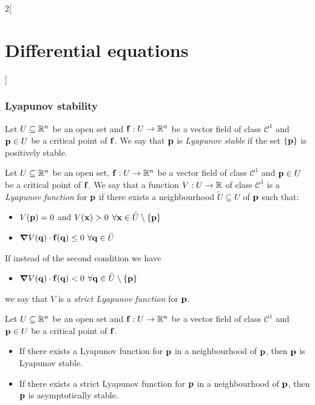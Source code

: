 \documentclass[../../../main.tex]{subfiles}
\begin{document}
\begin{multicols}{2}[\section{Differential equations}]
  \subsubsection{Lyapunov stability}
  \begin{definition}
    Let $U\subseteq \mathbb{R}^n$ be an open set and $\boldsymbol{\mathrm{f}}:U\rightarrow\mathbb{R}^n$ be a vector field of class $\mathcal{C}^1$ and $\boldsymbol{\mathrm{p}}\in U$ be a critical point of $\boldsymbol{\mathrm{f}}$. We say that $\boldsymbol{\mathrm{p}}$ is \emph{Lyapunov stable} if the set $\{\boldsymbol{\mathrm{p}}\}$ is positively stable.
  \end{definition}
  \begin{definition}
    Let $U\subseteq \mathbb{R}^n$ be an open set, $\boldsymbol{\mathrm{f}}:U\rightarrow\mathbb{R}^n$ be a vector field of class $\mathcal{C}^1$ and $\boldsymbol{\mathrm{p}}\in U$ be a critical point of $\boldsymbol{\mathrm{f}}$. We say that a function $V:U\rightarrow\mathbb{R}$ of class $\mathcal{C}^1$ is a \emph{Lyapunov function} for $\boldsymbol{\mathrm{p}}$ if there exists a neighbourhood $\tilde{U}\subseteq U$ of $\boldsymbol{\mathrm{p}}$ such that:
    \begin{itemize}
      \item $V(\boldsymbol{\mathrm{p}})=0$ and $V(\boldsymbol{\mathrm{x}})>0$ $\forall \boldsymbol{\mathrm{x}}\in\tilde{U}\setminus\{\boldsymbol{\mathrm{p}}\}$
      \item $\grad V(\boldsymbol{\mathrm{q}})\cdot \boldsymbol{\mathrm{f}}(\boldsymbol{\mathrm{q}})\leq 0$ $\forall \boldsymbol{\mathrm{q}}\in \tilde{U}$
    \end{itemize}
    If instead of the second condition we have
    \begin{itemize}
      \item $\grad V(\boldsymbol{\mathrm{q}})\cdot \boldsymbol{\mathrm{f}}(\boldsymbol{\mathrm{q}})<0$ $\forall \boldsymbol{\mathrm{q}}\in \tilde{U}\setminus\{\boldsymbol{\mathrm{p}}\}$
    \end{itemize}
    we say that $V$ is a \emph{strict Lyapunov function} for $\boldsymbol{\mathrm{p}}$.
  \end{definition}
  \begin{theorem}
    Let $U\subseteq \mathbb{R}^n$ be an open set and $\boldsymbol{\mathrm{f}}:U\rightarrow\mathbb{R}^n$ be a vector field of class $\mathcal{C}^1$ and $\boldsymbol{\mathrm{p}}\in U$ be a critical point of $\boldsymbol{\mathrm{f}}$.
    \begin{itemize}
      \item If there exists a Lyapunov function for $\boldsymbol{\mathrm{p}}$ in a neighbourhood of $\boldsymbol{\mathrm{p}}$, then $\boldsymbol{\mathrm{p}}$ is Lyapunov stable.
      \item If there exists a strict Lyapunov function for $\boldsymbol{\mathrm{p}}$ in a neighbourhood of $\boldsymbol{\mathrm{p}}$, then $\boldsymbol{\mathrm{p}}$ is asymptotically stable.
    \end{itemize}
  \end{theorem}
  \begin{theorem}

\end{theorem}
\end{multicols}
\end{document}
